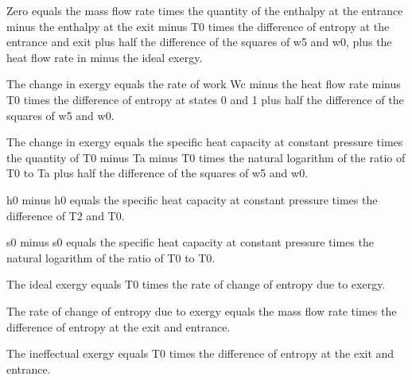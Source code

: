 Zero equals the mass flow rate times the quantity of the enthalpy at the entrance minus the enthalpy at the exit minus T0 times the difference of entropy at the entrance and exit plus half the difference of the squares of w5 and w0, plus the heat flow rate in minus the ideal exergy.

The change in exergy equals the rate of work Wc minus the heat flow rate minus T0 times the difference of entropy at states 0 and 1 plus half the difference of the squares of w5 and w0.

The change in exergy equals the specific heat capacity at constant pressure times the quantity of T0 minus Ta minus T0 times the natural logarithm of the ratio of T0 to Ta plus half the difference of the squares of w5 and w0.

h0 minus h0 equals the specific heat capacity at constant pressure times the difference of T2 and T0.

s0 minus s0 equals the specific heat capacity at constant pressure times the natural logarithm of the ratio of T0 to T0.

The ideal exergy equals T0 times the rate of change of entropy due to exergy.

The rate of change of entropy due to exergy equals the mass flow rate times the difference of entropy at the exit and entrance.

The ineffectual exergy equals T0 times the difference of entropy at the exit and entrance.